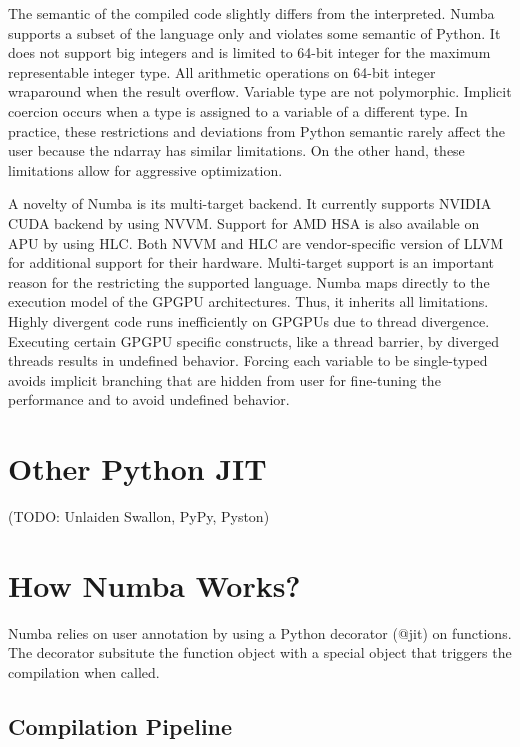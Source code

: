 \documentclass{acm_proc_article-sp}
\begin{document}
The semantic of the compiled code slightly differs
from the interpreted. Numba supports a subset of the language only
and violates some semantic of Python.  It does not support big integers
and is limited to 64-bit integer for the maximum representable integer type.
All arithmetic operations on 64-bit integer wraparound when the result
overflow.  Variable type are not polymorphic.  Implicit coercion occurs when
a type is assigned to a variable of a different type. In practice, these
restrictions and deviations from Python semantic rarely affect the user
because the ndarray has similar limitations. On the other hand, these
limitations allow for aggressive optimization.

A novelty of Numba is its multi-target backend.  It currently supports NVIDIA
CUDA backend by using NVVM.  Support for AMD HSA is also available on APU by
using HLC.  Both NVVM and HLC are vendor-specific version of LLVM for
additional support for their hardware.  Multi-target support is an important
reason for the restricting the supported language.
Numba maps directly to the execution model of the GPGPU architectures.
Thus, it inherits all limitations.
Highly divergent code runs inefficiently on GPGPUs due to thread divergence.
Executing certain GPGPU specific constructs, like a thread barrier, by diverged
threads results in undefined behavior. Forcing each variable to be single-typed
avoids implicit branching that are hidden from user for fine-tuning the
performance and to avoid undefined behavior.

\section{Other Python JIT}

(TODO: Unlaiden Swallon, PyPy, Pyston)

\section{How Numba Works?}

Numba relies on user annotation by using a Python decorator (@jit) on functions.
The decorator subsitute the function object with a special object that triggers
the compilation when called.

\subsection{Compilation Pipeline}
\end{document}
